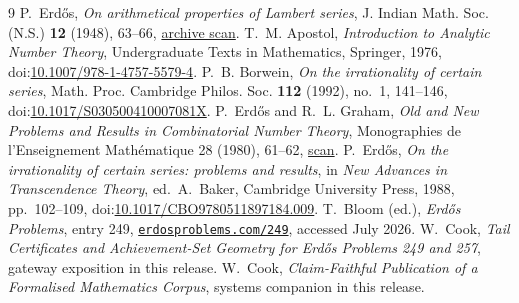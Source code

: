 \documentclass[11pt]{article}
\theoremstyle{remark}\newtheorem*{remark}{Remark}
\begin{document}
\begin{thebibliography}{9}
 P.~Erd\H{o}s,
\emph{On arithmetical properties of Lambert series},
J. Indian Math. Soc. (N.S.) \textbf{12} (1948), 63--66,
\href{https://users.renyi.hu/~p_erdos/1948-04.pdf}{archive scan}.
 T.~M. Apostol,
\emph{Introduction to Analytic Number Theory},
Undergraduate Texts in Mathematics, Springer, 1976,
doi:\href{https://doi.org/10.1007/978-1-4757-5579-4}{10.1007/978-1-4757-5579-4}.
 P.~B. Borwein,
\emph{On the irrationality of certain series},
Math. Proc. Cambridge Philos. Soc. \textbf{112} (1992), no.~1, 141--146,
doi:\href{https://doi.org/10.1017/S030500410007081X}{10.1017/S030500410007081X}.
 P.~Erd\H{o}s and R.~L. Graham,
\emph{Old and New Problems and Results in Combinatorial Number Theory},
Monographies de l'Enseignement Math\'ematique 28 (1980), 61--62,
\href{https://mathweb.ucsd.edu/~ronspubs/80_11_number_theory.pdf}{scan}.
 P.~Erd\H{o}s,
\emph{On the irrationality of certain series: problems and results},
in \emph{New Advances in Transcendence Theory}, ed.~A.~Baker,
Cambridge University Press, 1988, pp.~102--109,
doi:\href{https://doi.org/10.1017/CBO9780511897184.009}{10.1017/CBO9780511897184.009}.
 T.~Bloom (ed.), \emph{Erd\H{o}s Problems}, entry 249,
\href{https://www.erdosproblems.com/249}{\texttt{erdosproblems.com/249}},
accessed July 2026.
 W.~Cook, \emph{Tail Certificates and Achievement-Set
Geometry for Erd\H{o}s Problems 249 and 257}, gateway exposition in this
release.
 W.~Cook, \emph{Claim-Faithful Publication of a Formalised
Mathematics Corpus}, systems companion in this release.
\end{thebibliography}
\end{document}
